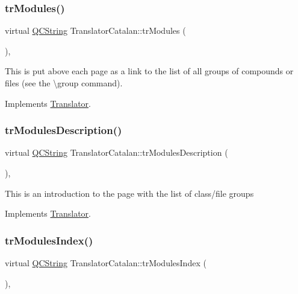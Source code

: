 \subsubsection{\texorpdfstring{trModules()}{trModules()}}
{\footnotesize\ttfamily virtual \mbox{\hyperlink{class_q_c_string}{Q\+C\+String}} Translator\+Catalan\+::tr\+Modules (\begin{DoxyParamCaption}{ }\end{DoxyParamCaption})\hspace{0.3cm}{\ttfamily [inline]}, {\ttfamily [virtual]}}

This is put above each page as a link to the list of all groups of compounds or files (see the \textbackslash{}group command). 

Implements \mbox{\hyperlink{class_translator}{Translator}}.

\mbox{\label{class_translator_catalan_ada519f7698aabeb86eb60eade9c99fc7}} 
\subsubsection{\texorpdfstring{trModulesDescription()}{trModulesDescription()}}
{\footnotesize\ttfamily virtual \mbox{\hyperlink{class_q_c_string}{Q\+C\+String}} Translator\+Catalan\+::tr\+Modules\+Description (\begin{DoxyParamCaption}{ }\end{DoxyParamCaption})\hspace{0.3cm}{\ttfamily [inline]}, {\ttfamily [virtual]}}

This is an introduction to the page with the list of class/file groups 

Implements \mbox{\hyperlink{class_translator}{Translator}}.

\mbox{\label{class_translator_catalan_a4540a8e9edb985cec7da2f40fd50af83}} 
\subsubsection{\texorpdfstring{trModulesIndex()}{trModulesIndex()}}
{\footnotesize\ttfamily virtual \mbox{\hyperlink{class_q_c_string}{Q\+C\+String}} Translator\+Catalan\+::tr\+Modules\+Index (\begin{DoxyParamCaption}{ }\end{DoxyParamCaption})\hspace{0.3cm}{\ttfamily [inline]}, {\ttfamily [virtual]}}

